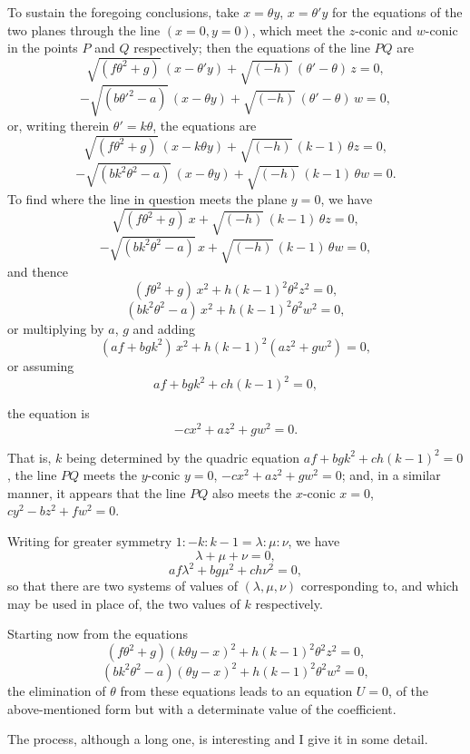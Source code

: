 \documentclass[11pt,a4paper]{article}
\begin{document}
To sustain the foregoing conclusions, take $x = \theta y$, $x = \theta' y$ for the equations of the two planes through the line $(x = 0, y = 0)$, which meet the $z$-conic and $w$-conic in the points $P$ and $Q$ respectively; then the equations of the line $PQ$ are
\[
\sqrt{(f\theta^{2} + g)}\,(x - \theta' y) + \sqrt{(-h)}\,(\theta' - \theta)\, z = 0,
\]
\[
-\sqrt{(b\theta'^{2} - a)}\,(x - \theta y) + \sqrt{(-h)}\,(\theta' - \theta)\, w = 0,
\]
or, writing therein $\theta' = k\theta$, the equations are
\[
\sqrt{(f\theta^{2} + g)}\,(x - k\theta y) + \sqrt{(-h)}\,(k - 1)\,\theta z = 0,
\]
\[
-\sqrt{(bk^{2}\theta^{2} - a)}\,(x - \theta y) + \sqrt{(-h)}\,(k - 1)\,\theta w = 0.
\]
To find where the line in question meets the plane $y = 0$, we have
\[
\sqrt{(f\theta^{2} + g)}\, x + \sqrt{(-h)}\,(k - 1)\,\theta z = 0,
\]
\[
-\sqrt{(bk^{2}\theta^{2} - a)}\, x + \sqrt{(-h)}\,(k - 1)\,\theta w = 0,
\]
and thence
\[
(f\theta^{2} + g)\, x^{2} + h(k - 1)^{2}\theta^{2} z^{2} = 0,
\]
\[
(bk^{2}\theta^{2} - a)\, x^{2} + h(k - 1)^{2}\theta^{2} w^{2} = 0,
\]
or multiplying by $a$, $g$ and adding
\[
(af + bgk^{2})\, x^{2} + h(k - 1)^{2}(az^{2} + gw^{2}) = 0,
\]
or assuming
\[
af + bgk^{2} + ch(k - 1)^{2} = 0,
\]

\newpage


the equation is
\[
-cx^{2} + az^{2} + gw^{2} = 0.
\]

That is, $k$ being determined by the quadric equation $af + bgk^{2} + ch(k - 1)^{2} = 0$, the line $PQ$ meets the $y$-conic $y = 0$, $-cx^{2} + az^{2} + gw^{2} = 0$; and, in a similar manner, it appears that the line $PQ$ also meets the $x$-conic $x = 0$, $cy^{2} - bz^{2} + fw^{2} = 0$.

Writing for greater symmetry $1 : -k : k - 1 = \lambda : \mu : \nu$, we have
\[
\lambda + \mu + \nu = 0,
\]
\[
af\lambda^{2} + bg\mu^{2} + ch\nu^{2} = 0,
\]
so that there are two systems of values of $(\lambda, \mu, \nu)$ corresponding to, and which may be used in place of, the two values of $k$ respectively.

Starting now from the equations
\[
(f\theta^{2} + g)(k\theta y - x)^{2} + h(k - 1)^{2}\theta^{2} z^{2} = 0,
\]
\[
(bk^{2}\theta^{2} - a)(\theta y - x)^{2} + h(k - 1)^{2}\theta^{2} w^{2} = 0,
\]
the elimination of $\theta$ from these equations leads to an equation $U = 0$, of the above-mentioned form but with a determinate value of the coefficient.

The process, although a long one, is interesting and I give it in some detail.
\end{document}

